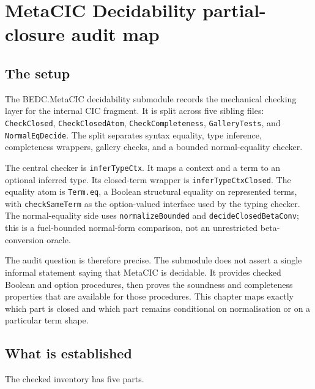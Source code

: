 \chapter{MetaCIC Decidability partial-closure audit map}
\label{ch:metacic-decidable-audit-map}

\section{The setup}
\label{sec:metacic-decidable-audit-map-setup}

The BEDC.MetaCIC decidability submodule records the mechanical checking layer
for the internal CIC fragment. It is split across five sibling files:
\texttt{CheckClosed}, \texttt{CheckClosedAtom}, \texttt{CheckCompleteness},
\texttt{GalleryTests}, and \texttt{NormalEqDecide}. The split separates
syntax equality, type inference, completeness wrappers, gallery checks, and a
bounded normal-equality checker.

The central checker is \texttt{inferTypeCtx}. It maps a context and a term to
an optional inferred type. Its closed-term wrapper is
\texttt{inferTypeCtxClosed}. The equality atom is \texttt{Term.eq}, a Boolean
structural equality on represented terms, with \texttt{checkSameTerm} as the
option-valued interface used by the typing checker. The normal-equality side
uses \texttt{normalizeBounded} and \texttt{decideClosedBetaConv}; this is a
fuel-bounded normal-form comparison, not an unrestricted beta-conversion
oracle.

The audit question is therefore precise. The submodule does not assert a
single informal statement saying that MetaCIC is decidable. It provides
checked Boolean and option procedures, then proves the soundness and
completeness properties that are available for those procedures. This chapter
maps exactly which part is closed and which part remains conditional on
normalisation or on a particular term shape.

\section{What is established}
\label{sec:metacic-decidable-audit-map-established}

The checked inventory has five parts.

